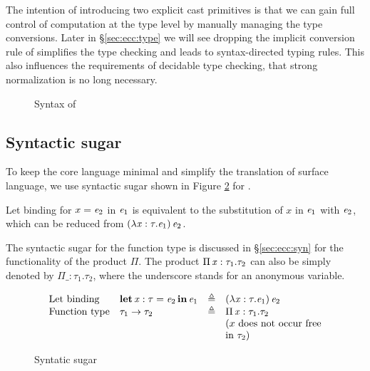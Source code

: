 The intention of introducing two explicit cast primitives is that we can gain full control of computation at the type level by manually managing the type conversions. Later in \S \ref{sec:ecc:type} we will see dropping the implicit conversion rule of \cc simplifies the type checking and leads to syntax-directed typing rules. This also influences the requirements of decidable type checking, that strong normalization is no long necessary.

\begin{figure}[ht]
	\gram{\otte\ottinterrule
		\otts\ottinterrule
		\ottG\ottinterrule
		\ottv}
	\caption{Syntax of \expcc}
	\label{fig:ecc:syntax}
\end{figure}

\subsection{Syntactic sugar}

To keep the core language minimal and simplify the translation of surface language, we use syntactic sugar shown in Figure \ref{fig:ecc:sugar} for \expcc.

Let binding for $x=\mathit{e_{{\mathrm{2}}}}$ in $\mathit{e_{{\mathrm{1}}}}$ is equivalent to the substitution of $x$ in $\mathit{e_{{\mathrm{1}}}}$ with $\mathit{e_{{\mathrm{2}}}}$, which can be reduced from $(  \lambda  \mathit{x}  :  \tau  .  \mathit{e_{{\mathrm{1}}}}  ) \, \mathit{e_{{\mathrm{2}}}}$.

The syntactic sugar for the function type is discussed in \S \ref{sec:ecc:syn} for the functionality of the product $ \Pi $. The product $\Pi \, \mathit{x}  :  \tau_{{\mathrm{1}}}  .  \tau_{{\mathrm{2}}}$ can also be simply denoted by $ \Pi  \_ : \tau_{{\mathrm{1}}} . \tau_{{\mathrm{2}}}$, where the underscore stands for an anonymous variable.

\begin{figure}[ht]
	\centering
	\[
	\begin{array}{llll}
	\text{Let binding} & \mathbf{let} \, \mathit{x}  :  \tau  =  \mathit{e_{{\mathrm{2}}}} \, \mathbf{in} \, \mathit{e_{{\mathrm{1}}}} & \triangleq & (  \lambda  \mathit{x}  :  \tau  .  \mathit{e_{{\mathrm{1}}}}  ) \, \mathit{e_{{\mathrm{2}}}} \\
	\text{Function type} & \tau_{{\mathrm{1}}}  \rightarrow  \tau_{{\mathrm{2}}} & \triangleq & \Pi \, \mathit{x}  :  \tau_{{\mathrm{1}}}  .  \tau_{{\mathrm{2}}}\\
	&&& \text{($x$ does not occur free}\\
	&&& \text{in $\tau_{{\mathrm{2}}}$)}
	\end{array}
	\]
	\caption{Syntatic sugar}
	\label{fig:ecc:sugar}
\end{figure}

